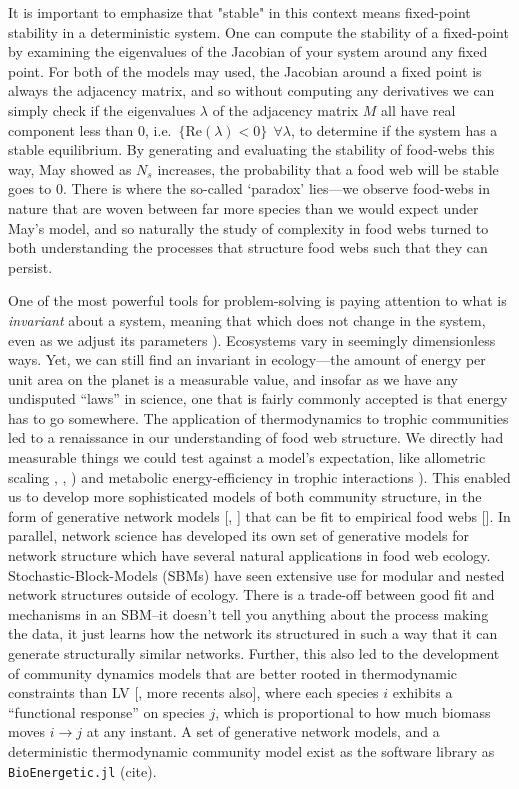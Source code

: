 \documentclass[]{article}
\begin{document}
It is important to emphasize that "stable" in this context means
fixed-point stability in a deterministic system. One can compute the
stability of a fixed-point by examining the eigenvalues of the Jacobian
of your system around any fixed point. For both of the models may used,
the Jacobian around a fixed point is always the adjacency matrix, and so
without computing any derivatives we can simply check if the eigenvalues
\(\lambda\) of the adjacency matrix \(M\) all have real component less
than \(0\), i.e.~\(\{ \text{Re}(\lambda) < 0 \} \ \ \forall\lambda\), to
determine if the system has a stable equilibrium. By generating and
evaluating the stability of food-webs this way, May showed as \(N_s\)
increases, the probability that a food web will be stable goes to \(0\).
There is where the so-called `paradox' lies---we observe food-webs in
nature that are woven between far more species than we would expect
under May's model, and so naturally the study of complexity in food webs
turned to both understanding the processes that structure food webs such
that they can persist.

One of the most powerful tools for problem-solving is paying attention
to what is \emph{invariant} about a system, meaning that which does not
change in the system, even as we adjust its parameters
\citep{polya}). Ecosystems vary in seemingly dimensionless ways.
Yet, we can still find an invariant in ecology---the amount of energy
per unit area on the planet is a measurable value, and insofar as we
have any undisputed ``laws'' in science, one that is fairly commonly
accepted is that energy has to go somewhere. The application of
thermodynamics to trophic communities led to a renaissance in our
understanding of food web structure. We directly had measurable things
we could test against a model's expectation, like allometric scaling
\citep{cohen_and_newman}, \citep{gravel_trophic_tibg},
\citep{stouffer_intervality}) and metabolic energy-efficiency in
trophic interactions \citep{yodzis_innes}). This enabled us to
develop more sophisticated models of both community structure, in the
form of generative network models {[}\citep{cohen_and_newman},
\citep{williams_martinez}{]} that can be fit to empirical food webs
{[}\citep{allesina}{]}. In parallel, network science has developed
its own set of generative models for network structure which have
several natural applications in food web ecology.
Stochastic-Block-Models (SBMs) have seen extensive use for modular and
nested network structures outside of ecology. There is a trade-off
between good fit and mechanisms in an SBM--it doesn't tell you anything
about the process making the data, it just learns how the network its
structured in such a way that it can generate structurally similar
networks. Further, this also led to the development of community
dynamics models that are better rooted in thermodynamic constraints than
LV {[}\citep{yodizs_innes}, more recents also{]}, where each species
\(i\) exhibits a ``functional response'' on species \(j\), which is
proportional to how much biomass moves \(i \to j\) at any instant. A set
of generative network models, and a deterministic thermodynamic
community model exist as the software library as
\texttt{BioEnergetic.jl} (cite).
\end{document}

